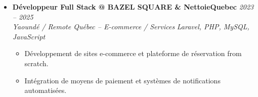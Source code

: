 \documentclass[a4paper,11pt]{article}
\begin{document}
\begin{itemize}[leftmargin=*, label={-}]
\item \textbf{Développeur Full Stack @ BAZEL SQUARE \& NettoieQuebec} \hfill \textit{2023 -- 2025} \\
\textit{Yaoundé / Remote Québec -- E-commerce / Services} \hfill \textit{Laravel, PHP, MySQL, JavaScript}
\vspace{-2pt}
    \begin{itemize}[leftmargin=0.4cm, nosep, label=\tiny$\bullet$]
        \item \small{Développement de sites e-commerce et plateforme de réservation from scratch.}
        \item \small{Intégration de moyens de paiement et systèmes de notifications automatisées.}
    \end{itemize}
\vspace{3pt}

\end{itemize}

\end{document}

